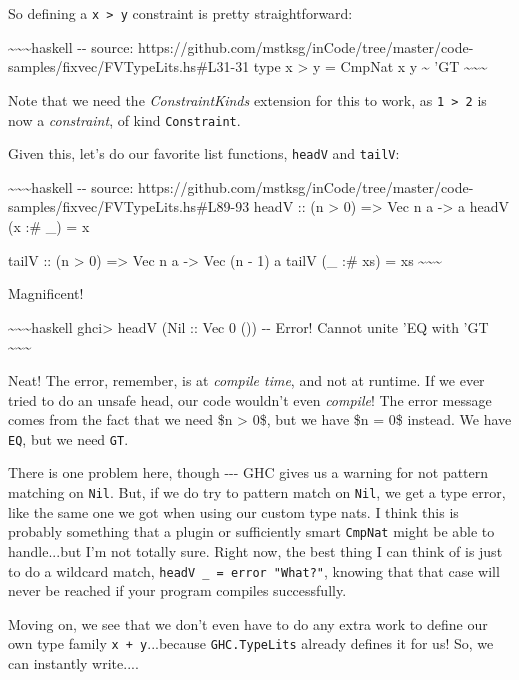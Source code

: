 \documentclass[]{article}
\begin{document}
So defining a \texttt{x\ \textgreater{}\ y} constraint is pretty
straightforward:

\textasciitilde{}\textasciitilde{}\textasciitilde{}haskell -\/- source:
https://github.com/mstksg/inCode/tree/master/code-samples/fixvec/FVTypeLits.hs\#L31-31
type x \textgreater{} y = CmpNat x y \textasciitilde{} 'GT
\textasciitilde{}\textasciitilde{}\textasciitilde{}

Note that we need the \emph{ConstraintKinds} extension for this to work, as
\texttt{1\ \textgreater{}\ 2} is now a \emph{constraint}, of kind
\texttt{Constraint}.

Given this, let's do our favorite list functions, \texttt{headV} and
\texttt{tailV}:

\textasciitilde{}\textasciitilde{}\textasciitilde{}haskell -\/- source:
https://github.com/mstksg/inCode/tree/master/code-samples/fixvec/FVTypeLits.hs\#L89-93
headV :: (n \textgreater{} 0) =\textgreater{} Vec n a -\textgreater{} a headV (x
:\# \_) = x

tailV :: (n \textgreater{} 0) =\textgreater{} Vec n a -\textgreater{} Vec (n -
1) a tailV (\_ :\# xs) = xs \textasciitilde{}\textasciitilde{}\textasciitilde{}

Magnificent!

\textasciitilde{}\textasciitilde{}\textasciitilde{}haskell ghci\textgreater{}
headV (Nil :: Vec 0 ()) -\/- Error! Cannot unite 'EQ with 'GT
\textasciitilde{}\textasciitilde{}\textasciitilde{}

Neat! The error, remember, is at \emph{compile time}, and not at runtime. If we
ever tried to do an unsafe head, our code wouldn't even \emph{compile}! The
error message comes from the fact that we need \$n \textgreater{} 0\$, but we
have \$n = 0\$ instead. We have \texttt{EQ}, but we need \texttt{GT}.

There is one problem here, though -\/-\/- GHC gives us a warning for not pattern
matching on \texttt{Nil}. But, if we do try to pattern match on \texttt{Nil}, we
get a type error, like the same one we got when using our custom type nats. I
think this is probably something that a plugin or sufficiently smart
\texttt{CmpNat} might be able to handle...but I'm not totally sure. Right now,
the best thing I can think of is just to do a wildcard match,
\texttt{headV\ \_\ =\ error\ "What?"}, knowing that that case will never be
reached if your program compiles successfully.

Moving on, we see that we don't even have to do any extra work to define our own
type family \texttt{x\ +\ y}...because \texttt{GHC.TypeLits} already defines it
for us! So, we can instantly write....
\end{document}
